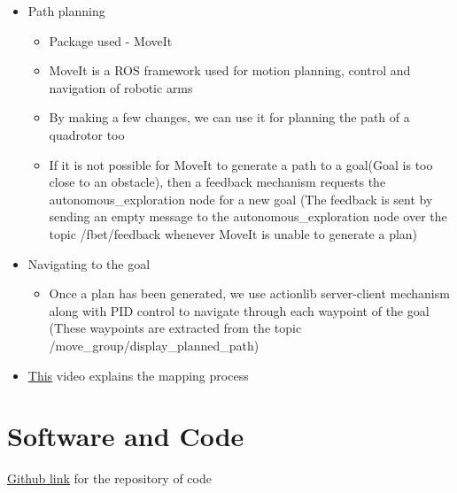 \documentclass[a4paper,12pt,oneside]{book}
\begin{document}
\begin{itemize}
	\item Path planning
		\begin{itemize}
			\item Package used - MoveIt
			\item MoveIt is a ROS framework used for motion planning, control and navigation of robotic arms
			\item By making a few changes, we can use it for planning the path of a quadrotor too
			\item If it is not possible for MoveIt to generate a path to a goal(Goal is too close to an obstacle), then a feedback mechanism requests the autonomous\_exploration node for a new goal (The feedback is sent by sending an empty message to the autonomous\_exploration node over the topic /fbet/feedback whenever MoveIt is unable to generate a plan)
		\end{itemize}

	\item Navigating to the goal
		\begin{itemize}
			\item Once a plan has been generated, we use actionlib server-client mechanism along with PID control to navigate through each waypoint of the goal (These waypoints are extracted from the topic /move\_group/display\_planned\_path)
		\end{itemize}
		
	\item \href{https://youtu.be/Ow4pZlDPhkY}{This} video explains the mapping process			
	
\end{itemize}

\pagebreak

\section{Software and Code}
\href{https://github.com/eYSIP-2017/eYSIP-2017_Indoor-Environments-Mapping-using-UAV}{Github link} for the repository of code
\end{document}
